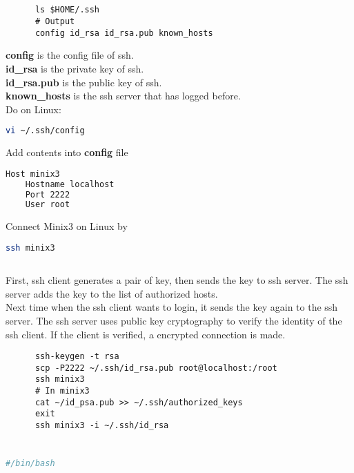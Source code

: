 \documentclass[12pt,a4paper]{article}
\theoremstyle{definition}
\begin{document}
\subsection{}
  \begin{lstlisting}
      ls $HOME/.ssh
      # Output
      config id_rsa id_rsa.pub known_hosts
  \end{lstlisting}
  \textbf{config} is the config file of ssh. \\
  \textbf{id\_rsa} is the private key of ssh. \\
  \textbf{id\_rsa.pub} is the public key of ssh. \\
  \textbf{known\_hosts} is the ssh server that has logged before. \\
  Do on Linux:
  \begin{lstlisting}[language=sh]
      vi ~/.ssh/config
  \end{lstlisting}
  Add contents into \textbf{config} file
  \begin{lstlisting}[language=sh]
    Host minix3
    Hostname localhost
    Port 2222
    User root
  \end{lstlisting}
  Connect Minix3 on Linux by 
  \begin{lstlisting}[language=sh]
    ssh minix3
  \end{lstlisting}
\subsection{}
  First, ssh client generates a pair of key, then sends the key to ssh server. The ssh server adds the key to the list of authorized hosts. \\
  Next time when the ssh client wants to login, it sends the key again to the ssh server. The ssh server uses public key cryptography to verify the identity of the ssh client. If the client is verified, a encrypted connection is made.
  \begin{lstlisting}
      ssh-keygen -t rsa
      scp -P2222 ~/.ssh/id_rsa.pub root@localhost:/root
      ssh minix3
      # In minix3
      cat ~/id_psa.pub >> ~/.ssh/authorized_keys
      exit
      ssh minix3 -i ~/.ssh/id_rsa
  \end{lstlisting}
\section{}
\subsection{}
  \begin{lstlisting}[language=sh]
    #/bin/bash
  \end{lstlisting}
\end{document}
